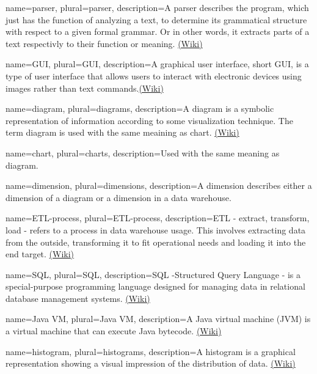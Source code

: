 {
  name=parser,
  plural=parser,
  description={A parser describes the program, which just has the function of analyzing a text, 
  to determine its grammatical structure with respect to a given formal grammar. Or in other words,
  it extracts parts of a text respectivly to their function or meaning. 
  \href{https://en.wikipedia.org/wiki/Parser}{(Wiki)} }
}


{
  name=GUI,
  plural=GUI,
  description={A graphical user interface, short GUI, is a type of user interface 
  that allows users to interact with electronic devices using images rather 
  than text commands.\href{https://en.wikipedia.org/wiki/Graphical_user_interface}{(Wiki)}}
}


{
  name=diagram,
  plural=diagrams,
  description={A diagram is a symbolic representation of information according to some
  visualization technique. The term diagram is used with the same meaining as \gls{chart}.
  \href{https://en.wikipedia.org/wiki/Diagram}{(Wiki)}}
}


{
  name=chart,
  plural=charts,
  description={Used with the same meaning as \gls{diagram}.}
}


{
  name=dimension,
  plural=dimensions,
  description={A dimension describes either a dimension of a \gls{diagram} or a dimension in a
  \gls{data warehouse}.  }
}


{
  name=ETL-process,
  plural=ETL-process,
  description={ETL - extract, transform, load - refers to a process in \gls{data warehouse} usage. This involves
  extracting data from the outside, transforming it to fit operational needs and loading it into the end target.
 \href{https://de.wikipedia.org/wiki/ETL-Prozess}{(Wiki)}}
}


{
  name=SQL,
  plural=SQL,
  description={SQL -Structured Query Language - is a special-purpose programming language designed for 
  managing data in relational \gls{database} management systems. \href{https://en.wikipedia.org/wiki/Sql}{(Wiki)}}
}


{
  name=Java VM,
  plural=Java VM,
  description={A Java virtual machine (JVM) is a virtual machine that can execute Java bytecode. 
  \href{https://en.wikipedia.org/wiki/Java_virtual_machine}{(Wiki)}}
}


{
  name=histogram,
  plural=histograms,
  description={A histogram is a graphical representation showing a visual impression of the distribution of data. 
   \href{http://en.wikipedia.org/wiki/Histogram}{(Wiki)}}
}


